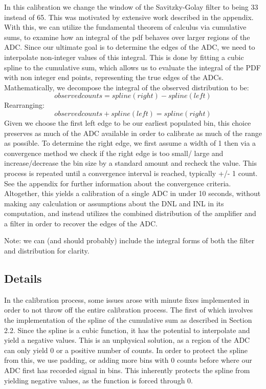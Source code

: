 \documentclass[11pt, letterpaper]{article}
\begin{document}
In this calibration we change the window of the Savitzky-Golay filter to being 33 instead of 65. 
This was motivated by extensive work described in the appendix. 
With this, we can utilize the fundamental theorem of calculus via cumulative sums, to examine how an integral of the pdf behaves over larger regions of the ADC. 
Since our ultimate goal is to determine the edges of the ADC, we need to interpolate non-integer values of this integral. 
This is done by fitting a cubic spline to the cumulative sum, which allows us to evaluate the integral of the PDF with non integer end points, representing the true edges of the ADCs. 
Mathematically, we decompose the integral of the observed distribution to be:
\[observed counts = spline(right) - spline(left) \]
Rearranging: 
\[observed counts + spline(left) = spline(right) \]
Given we choose the first left edge to be our earliest populated bin, this choice preserves as much of the ADC available in order to calibrate as much of the range as possible. 
To determine the right edge, we first assume a width of 1 then via a convergence method we check if the right edge is too small/ large and increase/decrease the bin size by a standard amount and recheck the value. 
This process is repeated until a convergence interval is reached, typically +/- 1 count. 
See the appendix for further information about the convergence criteria. 
Altogether, this yields a calibration of a single ADC in under 10 seconds, without making any calculation or assumptions about the DNL and INL in its computation, and instead utilizes the combined distribution of the amplifier and a filter in order to recover the edges of the ADC.  

Note: we can (and should probably) include the integral forms of both the filter and distribution for clarity. 

\subsection{Details} 
\indent 


In the calibration process, some issues arose with minute fixes implemented in order to not throw off the entire calibration process. 
The first of which involves the implementation of the spline of the cumulative sum as described in Section 2.2. 
Since the spline is a cubic function, it has the potential to interpolate and yield a negative values. 
This is an unphysical solution, as a region of the ADC can only yield 0 or a positive number of counts. 
In order to protect the spline from this, we use padding, or adding more bins with 0 counts before where our ADC first has recorded signal in bins. 
This inherently protects the spline from yielding negative values, as the function is forced through 0. 
\indent 
\end{document}
